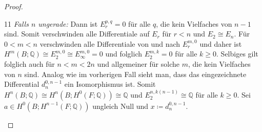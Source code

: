 \documentclass[11pt, a4paper, german]{article}
\theoremstyle{definition}
\theoremstyle{remark}
\newcommand{\Q}{\mathbb{Q}} %
\newcommand{\zeroDot}[2]{\node[draw,circle,inner sep=0.4pt,fill] at (#1,#2) {};} %
\begin{document}
\begin{proof}
  \vspace{1.5cm}

  \renewcommand\windowpagestuff{
    \begin{center}\begin{tikzpicture}[x=16pt,y=16pt]\begin{scope}[shift={(0,0)}]
      \foreach \x in {1,2,3}{
        \foreach \y in {0,1,...,6}{
          \zeroDot{\x}{\y}
        }
      }
      \foreach \y in {0,...,6}{
        \zeroDot{5}{\y}
      }
      \foreach \x in {0,...,5}{
        \node at (\x,7.3) {\vdots};
      }
      \node at (0,0) {$\Q$\small $1$};
      \zeroDot{0}{1}
      \zeroDot{0}{2}
      \node at (0,3) {$\Q$\small $a$};
      \zeroDot{0}{4}
      \zeroDot{0}{5}
      \node at (0,6) {$\Q$\small $a^2$};
      \node at (4,0) {$\Q$\small $x$};
      \zeroDot{4}{1}
      \zeroDot{4}{2}
      \node at (4,3) {$\Q$\small $ax$};
      \zeroDot{4}{4}
      \zeroDot{4}{5}
      \node at (4,6) {$\Q$\small $a^2 x$};
      \draw[->,gray] (0.6,2.6) -- (3.4,0.4);
      \draw[->,gray] (0.6,5.6) -- (3.4,3.4);
      \draw[->] (-0.7,-0.6) -- (5.6,-0.6); %
      \draw[->] (-0.7,-0.6) -- (-0.7,7.8); %
      \node[left] at (-0.7,0) {$0$};
      \node[left] at (-0.9,1.7) {\vdots};
      \node[left] at (-0.7,3) {$n{-}1$};
      \node[left] at (-0.9,4.7) {\vdots};
      \node[left] at (-0.7,6) {$2n{-}2$};
      \node[below] at (0,-0.6) {$0$};
      \node[below] at (2,-0.7) {$\cdots$};
      \node[below] at (4,-0.7) {$n$};
    \end{scope}\end{tikzpicture}\end{center}
  }
  \opencutleft
  \begin{cutout}{0}{0pt}{\dimexpr\linewidth-5.5cm\relax}{11}
    \emph{Falls $n$ ungerade:} \enspace
    Dann ist $E_r^{p,q} = 0$ für alle $q$, die kein Vielfaches von $n-1$ sind.
    Somit verschwinden alle Differentiale auf $E_r$ für $r < n$ und $E_2 \cong E_n$.
    Für $0 < m < n$ verschwinden alle Differentiale von und nach $E_r^{m,0}$ und daher ist $H^m(B; \Q) \cong E_2^{m,0} \cong E_\infty^{m,0} = 0$ und  folglich $E_2^{m,k} = 0$ für alle $k \geq 0$.
    Selbiges gilt folglich auch für $n < m < 2n$ und allgemeiner für solche $m$, die kein Vielfaches von $n$ sind.
    Analog wie im vorherigen Fall sieht man, dass das eingezeichnete Differential $d_n^{0,n-1}$ ein Isomorphismus ist.
    Somit $H^n(B; \Q) \cong H^n(B; H^0(F; \Q)) \cong \Q$ und $E_2^{n,k(n-1)} \cong \Q$ für alle $k \geq 0$.
    Sei $a \in H^0(B; H^{n-1}(F; \Q))$ ungleich Null und $x \coloneqq d_n^{0,n-1}$.

\end{cutout}
\end{proof}
\end{document}
